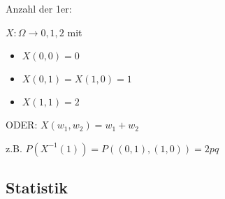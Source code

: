 \documentclass[paper=a4, fontsize=11pt]{scrartcl}
\numberwithin{equation}{section}
\numberwithin{figure}{section}
\numberwithin{table}{section}
\begin{document}
Anzahl der 1er:

$X: \Omega \rightarrow {0,1,2}$ mit
\begin{itemize}
\item $X(0,0)=0$
\item $X(0,1)= X(1,0)=1$
\item $X(1,1)= 2$
\end{itemize}

ODER: $X(w_{1},w_{2})=w_{1}+w_{2}$

z.B. $P(X^{-1}({1})) = P({(0,1),(1,0)})= 2pq$


\subsection{Statistik}
\end{document}
